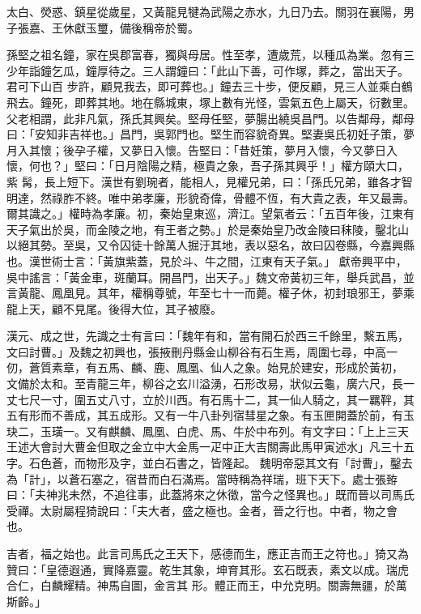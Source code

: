 \begin{pinyinscope}
 太白、熒惑、鎮星從歲星，又黃龍見犍為武陽之赤水，九日乃去。關羽在襄陽，男子張嘉、王休獻玉璽，備後稱帝於蜀。



 孫堅之祖名鐘，家在吳郡富春，獨與母居。性至孝，遭歲荒，以種瓜為業。忽有三少年詣鐘乞瓜，鐘厚待之。三人謂鐘曰：「此山下善，可作塚，葬之，當出天子。君可下山百
 步許，顧見我去，即可葬也。」鐘去三十步，便反顧，見三人並乘白鶴飛去。鐘死，即葬其地。地在縣城東，塚上數有光怪，雲氣五色上屬天，衍數里。父老相謂，此非凡氣，孫氏其興矣。堅母任堅，夢腸出繞吳昌門。以告鄰母，鄰母曰：「安知非吉祥也。」昌門，吳郭門也。堅生而容貌奇異。堅妻吳氏初妊子策，夢月入其懷；後孕子權，又夢日入懷。告堅曰：「昔妊策，夢月入懷，今又夢日入懷，何也？」堅曰：「日月陰陽之精，極貴之象，吾子孫其興乎！」權方頤大口，紫
 髯，長上短下。漢世有劉琬者，能相人，見權兄弟，曰：「孫氏兄弟，雖各才智明達，然祿胙不終。唯中弟孝廉，形貌奇偉，骨體不恆，有大貴之表，年又最壽。爾其識之。」權時為孝廉。初，秦始皇東巡，濟江。望氣者云：「五百年後，江東有天子氣出於吳，而金陵之地，有王者之勢。」於是秦始皇乃改金陵曰秣陵，鑿北山以絕其勢。至吳，又令囚徒十餘萬人掘汙其地，表以惡名，故曰囚卷縣，今嘉興縣也。漢世術士言：「黃旗紫蓋，見於斗、牛之間，江東有天子氣。」
 獻帝興平中，吳中謠言：「黃金車，斑蘭耳。開昌門，出天子。」魏文帝黃初三年，舉兵武昌，並言黃龍、鳳凰見。其年，權稱尊號，年至七十一而薨。權子休，初封琅邪王，夢乘龍上天，顧不見尾。後得大位，其子被廢。



 漢元、成之世，先識之士有言曰：「魏年有和，當有開石於西三千餘里，繫五馬，文曰討曹。」及魏之初興也，張掖刪丹縣金山柳谷有石生焉，周圍七尋，中高一仞，蒼質素章，有五馬、麟、鹿、鳳凰、仙人之象。始見於建安，形成於黃初，
 文備於太和。至青龍三年，柳谷之玄川溢湧，石形改易，狀似云龜，廣六尺，長一丈七尺一寸，圍五丈八寸，立於川西。有石馬十二，其一仙人騎之，其一羈靽，其五有形而不善成，其五成形。又有一牛八卦列宿彗星之象。有玉匣開蓋於前，有玉玦二，玉璜一。又有麒麟、鳳凰、白虎、馬、牛於中布列。有文字曰：「上上三天王述大會討大曹金但取之金立中大金馬一疋中正大吉關壽此馬甲寅述水」凡三十五字。石色蒼，而物形及字，並白石書之，皆隆起。
 魏明帝惡其文有「討曹」，鑿去為「計」，以蒼石塞之，宿昔而白石滿焉。當時稱為祥瑞，班下天下。處士張臶曰：「夫神兆未然，不追往事，此蓋將來之休徵，當今之怪異也。」既而晉以司馬氏受禪。太尉屬程猗說曰：「夫大者，盛之極也。金者，晉之行也。中者，物之會也。



 吉者，福之始也。此言司馬氏之王天下，感德而生，應正吉而王之符也。」猗又為贊曰：「皇德遐通，實降嘉靈。乾生其象，坤育其形。玄石既表，素文以成。瑞虎合仁，白麟耀精。神馬自圖，金言其
 形。體正而王，中允克明。關壽無疆，於萬斯齡。」




\end{pinyinscope}
